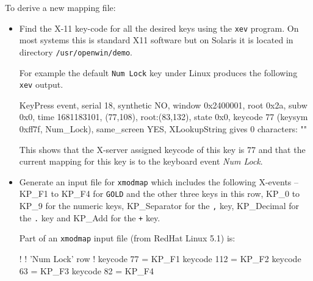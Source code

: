 \documentclass[twoside,11pt]{starlink}
\begin{document}
To derive a new mapping file:
\begin{itemize}

\item Find the X-11 key-code for all the desired keys using the \texttt{xev}
program. On most systems this is standard X11 software but on Solaris
it is located in directory \texttt{/usr/openwin/demo}.

For example the default \texttt{Num Lock} key under Linux produces the
following \texttt{xev} output.
\begin{terminalv}
KeyPress event, serial 18, synthetic NO, window 0x2400001,
    root 0x2a, subw 0x0, time 1681183101, (77,108), root:(83,132),
    state 0x0, keycode 77 (keysym 0xff7f, Num_Lock), same_screen YES,
    XLookupString gives 0 characters:  ""
\end{terminalv}

This shows that the X-server assigned keycode of this key is 77 and that the
current mapping for this key is to the keyboard event \textit{Num Lock}.

\item Generate an input file for \texttt{xmodmap} which includes the following
X-events -- KP\_F1 to KP\_F4 for \texttt{GOLD} and the other three keys in
this row, KP\_0 to KP\_9 for the numeric keys, KP\_Separator for the
\texttt{,} key,
KP\_Decimal for the \texttt{.} key and KP\_Add for the \texttt{+} key.

Part of an \texttt{xmodmap} input file (from RedHat Linux 5.1) is:
\begin{terminalv}
!
! 'Num Lock' row
!
keycode 77  = KP_F1
keycode 112 = KP_F2
keycode 63  = KP_F3
keycode 82  = KP_F4
\end{terminalv}

\end{itemize}
\end{document}
